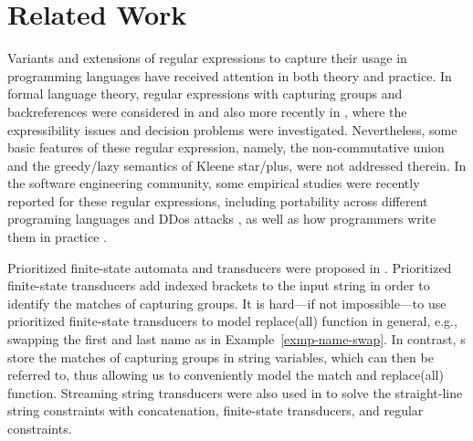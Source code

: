 \section{Related Work}
\label{sec-related}



{}
%
Variants and extensions of regular expressions to capture their usage in programming languages have received attention %
in both theory and practice. In formal language theory, regular expressions with capturing groups and backreferences were considered in \cite{CSY03,CN09} and also more recently in \cite{Freydenberger13,Schmid16,BM17b,FS19}, where the expressibility issues and decision problems were investigated. Nevertheless, some basic features of these regular expression, namely, the non-commutative union and the greedy/lazy semantics of Kleene star/plus, were not addressed therein. In the software engineering community, %
some empirical studies were recently reported for these regular expressions, including portability across different programing languages \cite{DMC+19} and DDos attacks \cite{SP18}, as well as how programmers write them in practice \cite{MDD+19}.


Prioritized finite-state automata and %
transducers were proposed in \cite{BM17}. Prioritized finite-state transducers add indexed brackets to the input string in order to identify the matches of capturing groups. It is hard---if not impossible---to use prioritized finite-state transducers to model replace(all) function in general, e.g., swapping the first and last name as in Example~\ref{exmp-name-swap}. In contrast, {\PSST}s store the matches of capturing groups in string variables, which can then be referred to, thus allowing us to conveniently model the match and replace(all) function. 
%
Streaming string transducers were also used in \cite{ZAM19} to solve the straight-line string constraints with concatenation, finite-state transducers, and regular constraints.

